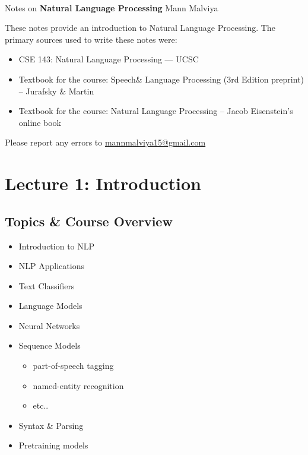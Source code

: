\documentclass[11pt]{article}
\begin{document}
\thispagestyle{empty}
\bigskip \
\vspace{0.1cm}

\begin{center}
{\fontsize{22}{22} \selectfont Notes on}
\vskip 16pt
{\fontsize{20}{20} \selectfont \bf \sffamily Natural Language Processing}
\vskip 24pt
{\fontsize{18}{18} \selectfont \rmfamily Mann Malviya}
\vskip 6pt
{\fontsize{14}{14} \selectfont {}}
\vskip 24pt
\end{center}

{\parindent0pt \baselineskip=15.5pt These notes provide an introduction to Natural Language Processing. The primary sources used to write these notes were:

\begin{itemize}
    \item CSE 143: Natural Language Processing — UCSC
    \item Textbook for the course: Speech\& Language Processing (3rd Edition preprint) -- Jurafsky \& Martin
    \item Textbook for the course: Natural Language Processing -- Jacob Eisenstein's online book

\end{itemize}

Please report any errors to \href{mailto:mannmalviya15@gmail.com}{mannmalviya15@gmail.com}


}

\newpage
\tableofcontents
\newpage

\section*{Lecture 1: Introduction}

\subsection*{Topics \& Course Overview}
\begin{itemize}
  \item Introduction to NLP
  \item NLP Applications
  \item Text Classifiers
  \item Language Models
  \item Neural Networks
  \item Sequence Models 
  \begin{itemize}
    \item part-of-speech tagging
    \item named-entity recognition
    \item etc..
  \end{itemize}
  \item Syntax \& Parsing
  \item Pretraining models
\end{itemize}
\end{document}
